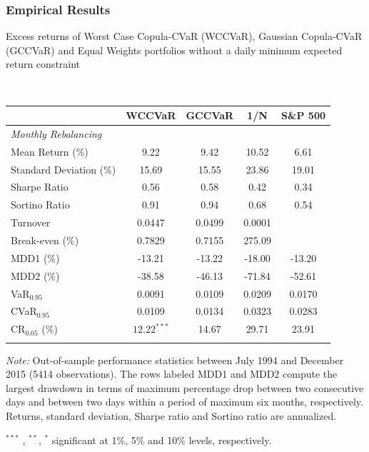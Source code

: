 \documentclass[pdf,10pt,xcolor=dvipsnames,hide notes]{beamer}
\begin{document}
\begin{frame}
	\frametitle{Empirical Results}
	
	
	\begin{threeparttable}[H]
		\caption{Excess returns of Worst Case Copula-CVaR (WCCVaR), Gaussian Copula-CVaR (GCCVaR) and Equal Weights portfolios without a daily minimum expected return constraint}
		\label{tab:tabletwo}\centering
		\tiny \
		\begin{tabularx}{\textwidth}{@{\extracolsep{\fill}}lcccc@{}}
			\toprule & \textbf{WCCVaR} & \textbf{GCCVaR} & \textbf{1/N} & \textbf{S\&P 500%
			} \\
						\midrule[\heavyrulewidth] \textit{Monthly Rebalancing} &  &  &  &  \\
						\midrule[\heavyrulewidth] Mean Return (\%) & 9.22 & 9.42 & 10.52 & 6.61
						\\
						Standard Deviation (\%) & 15.69 & 15.55 & 23.86 & 19.01 \\
						Sharpe Ratio & 0.56 & 0.58 & 0.42 & 0.34 \\
						Sortino Ratio & 0.91 & 0.94 & 0.68 & 0.54 \\
						Turnover & 0.0447 & 0.0499 & 0.0001 &  \\
						Break-even (\%) & \cellcolor{corn} 0.7829 & \cellcolor{celadon} 0.7155 & 275.09 &  \\
						MDD1 (\%) & -13.21 & -13.22 & -18.00 & -13.20 \\
						MDD2 (\%) & -38.58 & -46.13 & -71.84 & -52.61 \\
						VaR$_{0.95}$ &  0.0091 & 0.0109 & 0.0209  & 0.0170 \\
							CVaR$_{0.95}$ & 0.0109 & 0.0134 & 0.0323 & 0.0283 \\
						CR$_{0.05}$ (\%) & \cellcolor{corn} $12.22^{***}$ & 14.67 & 29.71  & 23.91  \\
			\bottomrule &  &  &  &
		\end{tabularx}%
		\begin{tablenotes}
			\item \textit{Note:} \tiny Out-of-sample performance statistics between July 1994 and December 2015 (5414 observations). The rows labeled MDD1 and MDD2 compute the largest drawdown in terms of maximum percentage drop between two consecutive days and between two days within a period of maximum six months, respectively. Returns, standard deviation, Sharpe ratio and Sortino ratio are annualized.
			\item \scriptsize $^{\ast\ast\ast}$ , $^{\ast\ast}$, $^{\ast}$ significant at 1\%, 5\% and 10\% levels, respectively.
		\end{tablenotes}
		\label{tab:table02}%
	\end{threeparttable}
	
\end{frame}
\end{document}
